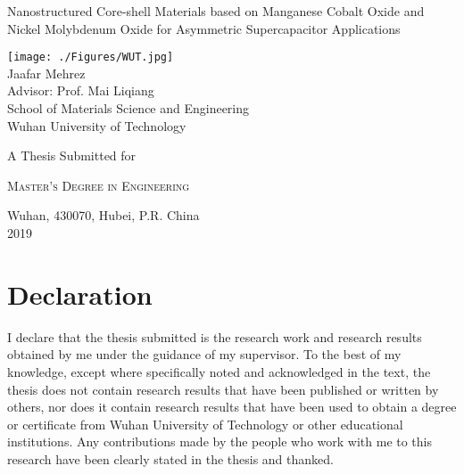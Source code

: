 \documentclass[reprint,amsmath,amssymb,aps,floatfix,
]{revtex4-2}
\begin{document}
\pagestyle{empty}
\begin{center}
\onecolumngrid
    \LARGE
    {Nanostructured Core-shell Materials based on Manganese  Cobalt Oxide and Nickel Molybdenum Oxide for  Asymmetric Supercapacitor Applications\par}   
    \vspace{4cm}
    \texttt{[image: ./Figures/WUT.jpg]}\\
    \vspace{1cm}
    { Jaafar Mehrez  \\Advisor: Prof. Mai Liqiang\\}
    \vspace{1cm}
    {School of Materials Science and Engineering\\Wuhan University of Technology\\}
    \vspace{3cm}
    \par
\begin{minipage}{.5\linewidth}
        \normalsize\centering
        A Thesis Submitted for\par
        \textsc{Master's Degree in Engineering}\par
        Wuhan, 430070, Hubei, P.R. China\\  
        2019
    \end{minipage}
    \vfill
\end{center}
    \newpage
{}
\tableofcontents
\newpage
\section*{\label{sec:level1}D\lowercase{eclaration}}
I declare that the thesis submitted is the research work and research results obtained by me under the guidance of my supervisor. To the best of my knowledge, except where specifically noted and acknowledged in the text, the thesis does not contain research results that have been published or written by others, nor does it contain research results that have been used to obtain a degree or certificate from Wuhan University of Technology or other educational institutions. Any contributions made by the people who work with me to this research have been clearly stated in the thesis and thanked.
\newpage
\end{document}
